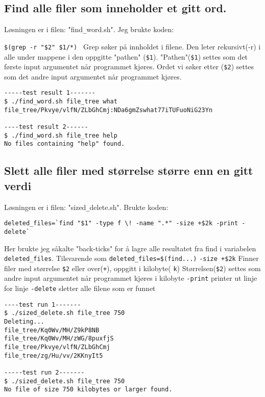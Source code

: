 \documentclass{article}
\begin{document}
\subsection{Find alle filer som inneholder et gitt ord.}
Løsningen er i filen: "find\verb;_;word.sh". Jeg brukte koden:\par
\verb;$(grep -r "$2" $1/*) ;\newline\newline
Grep søker på innholdet i filene. Den leter rekursivt(-r) i alle under mappene i den oppgitte "pathen" (\verb;$1;). 
"Pathen"(\verb;$1;) settes som det første input argumentet når programmet kjøres.
Ordet vi søker etter (\verb;$2;) settes som det andre input argumentet når programmet kjøres.\par

\begin{verbatim} 
-----test result 1-------
$ ./find_word.sh file_tree what
file_tree/Pkvye/vlfN/ZLbGhCmj:NDa6gmZswhat77iTUFuoNiG23Yn

----test result 2------
$ ./find_word.sh file_tree help
No files containing "help" found.

\end{verbatim}

\subsection{Slett alle filer med størrelse større enn en gitt verdi}
Løsningen er i filen: "sized\verb;_;delete.sh". Brukte koden:\par
\verb;deleted_files=`find "$1" -type f \! -name ".*" -size +$2k -print -delete`;\par
Her brukte jeg såkalte "back-ticks" for å lagre alle resultatet fra find i variabelen \verb;deleted_files;. 
Tilsvarende som \verb;deleted_files=$(find...);\newline
\verb;-size +$2k; Finner filer med størrelse \verb;$2; eller over(\verb;+;), oppgitt i kilobyte( \verb;k;) Størrelsen(\verb;$2;) settes som andre input argumentet når programmet kjøres i kilobyte \newline
\verb;-print; printer ut linje for linje\newline
\verb;-delete; sletter alle filene som er funnet\newline
\begin{verbatim} 
----test run 1-------
$ ./sized_delete.sh file_tree 750
Deleting... 
file_tree/Kq0Wv/MH/Z9kP8NB
file_tree/Kq0Wv/MH/zWG/8puxfjS
file_tree/Pkvye/vlfN/ZLbGhCmj
file_tree/zg/Hu/vv/2KKnyIt5

-----test run 2-------
$ ./sized_delete.sh file_tree 750
No file of size 750 kilobytes or larger found.
\end{verbatim}
\end{document}
